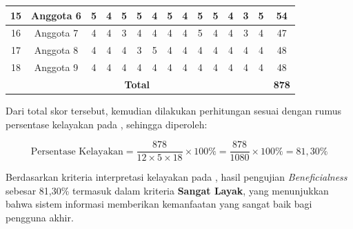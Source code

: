\begin{table}[H]
\begin{tabular}{|c|c|c|c|c|c|c|c|c|c|c|c|c|c|c|}
            \hline
            15                                    & Anggota 6     & 5           & 4           & 5           & 5           & 4           & 5           & 4           & 5           & 5           & 4            & 3            & 5            & 54             \\
            \hline
            16                                    & Anggota 7     & 4           & 4           & 3           & 4           & 4           & 4           & 4           & 5           & 4           & 4            & 3            & 4            & 47             \\
            \hline
            17                                    & Anggota 8     & 4           & 4           & 4           & 3           & 5           & 4           & 4           & 4           & 4           & 4            & 4            & 4            & 48             \\
            \hline
            18                                    & Anggota 9     & 4           & 4           & 4           & 4           & 4           & 4           & 4           & 4           & 4           & 4            & 4            & 4            & 48             \\
            \hline
            \multicolumn{14}{|c|}{\textbf{Total}} & \textbf{878}                                                                                                                                                                                              \\
            \hline
      \end{tabular}
\end{table}

Dari total skor tersebut, kemudian dilakukan perhitungan sesuai dengan rumus persentase kelayakan pada , sehingga diperoleh:

\begin{equation}
      \text{Persentase Kelayakan} = \frac{878}{12 \times 5 \times 18} \times 100\% = \frac{878}{1080} \times 100\% = 81{,}30\%
\end{equation}

Berdasarkan kriteria interpretasi kelayakan pada , hasil pengujian \textit{Beneficialness} sebesar 81{,}30\% termasuk dalam kriteria \textbf{Sangat Layak}, yang menunjukkan bahwa sistem informasi memberikan kemanfaatan yang sangat baik bagi pengguna akhir.

